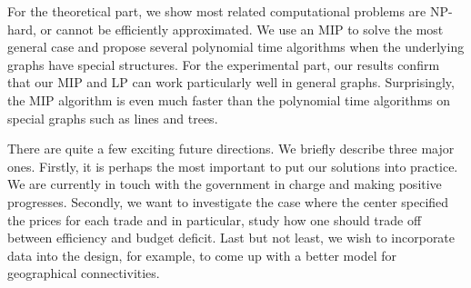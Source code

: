 \documentclass{aamas2015}
\begin{document}
For the theoretical part, we show most related computational problems are {\sc NP-hard}, or cannot be efficiently approximated.
We use an MIP to solve the most general case and propose several polynomial time algorithms when the underlying graphs have special structures.
For the experimental part, our results confirm that our MIP and LP can work particularly well in general graphs. Surprisingly, the MIP algorithm is even much faster than the polynomial time algorithms on special graphs such as lines and trees.

There are quite a few exciting future directions. We briefly describe three major ones. Firstly, it is perhaps the most important to put our solutions into practice. We are currently in touch with the government in charge and making positive progresses. Secondly, we want to investigate the case where the center specified the prices for each trade and in particular, study how one should trade off between efficiency and budget deficit. Last but not least, we wish to incorporate data into the design, for example, to come up with a better model for geographical connectivities.


\end{document}
